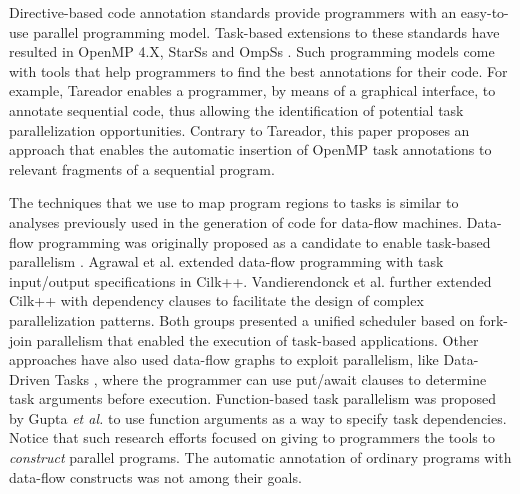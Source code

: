 \documentclass[sigplan,10pt,screen]{acmart}
\begin{document}
Directive-based code annotation standards provide programmers with an easy-to-use
parallel programming model.
Task-based extensions to these standards have resulted in OpenMP 4.X,
StarSs \cite{bellens:sc:2006, perez:iccc:2008, planas:hpca:2009,
tejedor:hpdc:2011} and OmpSs \cite{bueno:icpp:2011, duran:ppl:2011}.
Such programming models come with tools that help programmers to find the
best annotations for their code. For example,  Tareador
\cite{Ayguade15} enables a programmer, by means of a graphical interface,
to annotate sequential code, thus allowing the identification of potential task
parallelization opportunities.
Contrary to Tareador,  this paper proposes an approach that enables the
automatic insertion of OpenMP task annotations to relevant fragments of a
sequential program.

The techniques that we use to map program regions to tasks is similar to
analyses previously used in the generation of code for data-flow machines.
Data-flow programming was originally proposed as a candidate to enable
task-based parallelism \cite{agrawal:ipdps:2010, chan:spaa:2007,
gupta:micro:2011}.  Agrawal et al. \cite{agrawal:ipdps:2010}  extended
data-flow programming  with task input/output specifications in  Cilk++.
Vandierendonck et al.  \cite{vandierendonck:hotpar:2011} further extended Cilk++
with dependency clauses to facilitate the design of complex
parallelization patterns. Both groups presented a unified scheduler based on
fork-join parallelism \cite{vandierendonck:pact:2011} that enabled the
execution of task-based applications. Other approaches have also used
data-flow graphs to exploit parallelism, like Data-Driven Tasks
\cite{tasirlar:icpp:2011}, where the programmer can use put/await clauses to
determine task arguments before execution.
Function-based task parallelism was proposed by Gupta {\em et al.}
\cite{gupta:micro:2011} to use function arguments  as a way to
specify task  dependencies.
Notice that such research efforts focused on giving to programmers the tools to
{\em construct} parallel programs.
The automatic annotation of ordinary programs with data-flow constructs was not
among their goals.
\end{document}
